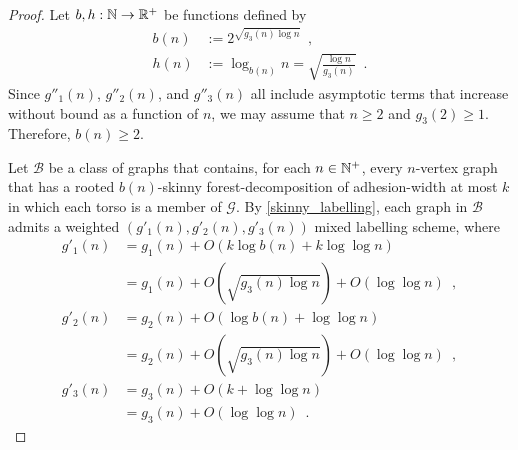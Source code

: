 \documentclass{patmorin}
\renewcommand{\ge}{\geqslant}
\newcommand{\Oh}{O}
\begin{document}
\begin{proof}
  Let $b,h:\mathbb{N}\to\mathbb{R}^+$ be functions defined by
  \begin{align*}
    b(n)
     & :=2^{\sqrt{g_3(n)\log n}}\enspace,                        \\
    h(n)
     & := \log_{b(n)}n = \sqrt{\frac{\log n}{g_3(n)}} \enspace .
  \end{align*}
  Since $g''_1(n)$, $g''_2(n)$, and $g''_3(n)$ all include asymptotic terms that increase without bound as a function of $n$, we may assume that $n\ge 2$ and $g_3(2)\ge 1$.  Therefore, $b(n)\ge 2$.

  Let $\mathcal{B}$ be a class of graphs that contains, for each $n\in\mathbb{N}^+$, every $n$-vertex graph that has a rooted $b(n)$-skinny forest-decomposition of adhesion-width at most $k$ in which each torso is a member of $\mathcal{G}$.
  By \cref{skinny_labelling}, each graph in $\mathcal{B}$ admits a
  weighted $(g'_1(n),g'_2(n),g'_3(n))$ mixed labelling scheme, where
  \begin{align*}
    g'_1(n)
     & = g_1(n) + \Oh(k \log b(n) + k \log\log n)                                 \\
     & = g_1(n) + \Oh\left(\sqrt{g_3(n) \log n}\right) + \Oh(\log\log n)\enspace, \\
    g'_2(n)
     & = g_2(n)+ \Oh(\log b(n) + \log\log n)                                      \\
     & = g_2(n) + \Oh\left(\sqrt{g_3(n) \log n}\right) + \Oh(\log\log n)\enspace, \\
    g'_3(n)
     & = g_3(n) + \Oh(k + \log\log n)                                             \\
     & = g_3(n) + \Oh(\log\log n)\enspace.
  \end{align*}


\end{proof}
\end{document}
